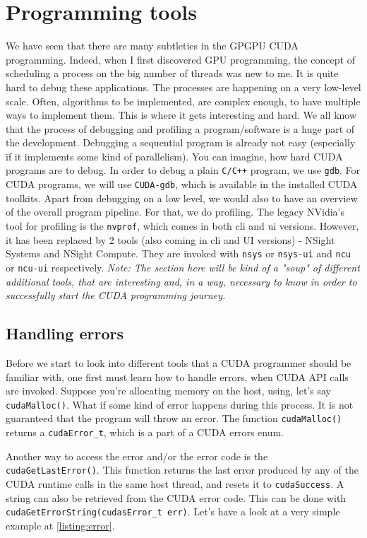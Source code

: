 \section{Programming tools}
We have seen that there are many subtleties in the GPGPU CUDA programming. 
Indeed, when I first discovered GPU programming, the concept of scheduling 
a process on the big number of threads was new to me. It is quite hard to 
debug these applications. The processes are happening on a very low-level scale. 
Often, algorithms to be implemented, are complex enough, to have multiple ways to implement them.
This is where it gets interesting and hard. We all know that the process of debugging 
and profiling a program/software is a huge part of the development. 
Debugging a sequential program is already not easy (especially if it implements some kind of parallelism). 
You can imagine, how hard CUDA programs are to debug. In order to debug a plain \verb|C/C++| program, we use 
\verb|gdb|. For CUDA programs, we will use \verb|CUDA-gdb|, which is available in the installed CUDA toolkits. 
Apart from debugging on a low level, we would also to have an overview of the overall program pipeline. For that, 
we do profiling. The legacy NVidia's tool for profiling is the \verb|nvprof|, which comes in both cli and ui versions.
However, it has been replaced by 2 tools (also coming in cli and UI versions) - NSight Systems and NSight Compute.
They are invoked with \verb|nsys| or \verb|nsys-ui| and \verb|ncu| or \verb|ncu-ui| respectively.
\textit{Note: The section here will be kind of a "soup" of different additional tools, that are interesting and, 
in a way, necessary to know in order to successfully start the CUDA programming journey.}

\subsection{Handling errors}
Before we start to look into different tools that a CUDA programmer should be familiar with, one first must learn how 
to handle errors, when CUDA API calls are invoked. Suppose you're allocating memory on the host, using, let's say \verb|cudaMalloc()|.
What if some kind of error happens during this process. It is not guaranteed that the program will throw an error.
The function \verb|cudaMalloc()| returns a \verb|cudaError_t|, which is a part of a CUDA errors enum. 

Another way to access the error and/or the error code is the \verb|cudaGetLastError()|. 
This function returns the last error produced by any of the CUDA runtime calls in the same host thread, 
and resets it to \verb|cudaSuccess|. A string can also be retrieved from the CUDA error code. This can be 
done with \verb|cudaGetErrorString(cudasError_t err)|.
Let's have a look at a very simple example at \autoref{listing:error}.

